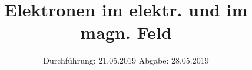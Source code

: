 

\subject{V501 und V502}
\title{Elektronen im elektr. und im magn. Feld}
\date{%
Durchführung: {21.05.2019}
\hspace{3em}
Abgabe: {28.05.2019}
}



\maketitle
\thispagestyle{empty}
\tableofcontents
\newpage





\printbibliography{}

